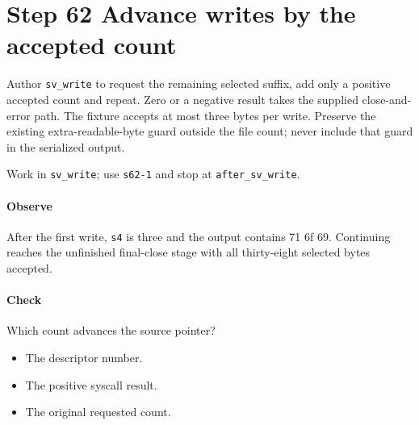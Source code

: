 \section{Step 62 Advance writes by the accepted count}\label{qoi-s62}
Author \texttt{sv\_write} to request the remaining selected suffix, add only a positive accepted count and repeat. Zero or a negative result takes the supplied close-and-error path. The fixture accepts at most three bytes per write. Preserve the existing extra-readable-byte guard outside the file count; never include that guard in the serialized output.

Work in \texttt{sv\_write}; use \texttt{s62-1} and stop at \texttt{after\_sv\_write}.

\paragraph{Observe} After the first write, \texttt{s4} is three and the output contains 71 6f 69. Continuing reaches the unfinished final-close stage with all thirty-eight selected bytes accepted.

\paragraph{Check} Which count advances the source pointer?
\begin{itemize}
  \item[A.] The descriptor number.
  \item[B.] The positive syscall result.
  \item[C.] The original requested count.
\end{itemize}
